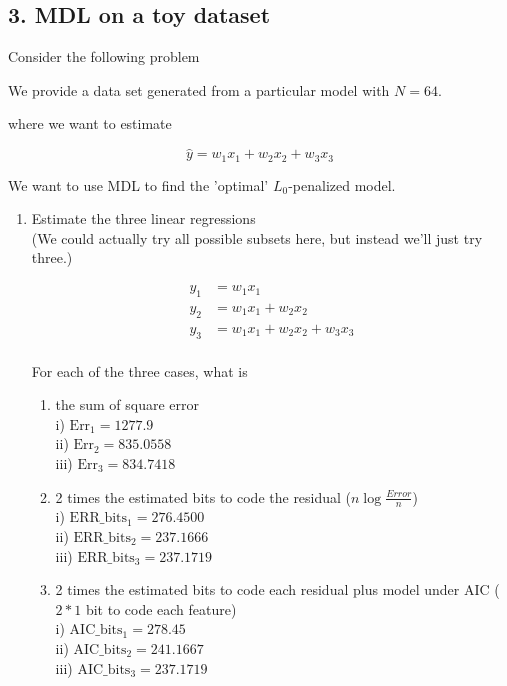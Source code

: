 \documentclass[english]{article}
\begin{document}
\subsection*{3. MDL on a toy dataset}

Consider the following problem

 We provide a data set generated from a particular model with $N=64$.

where we want to estimate

\begin{equation*}
 \hat{y} =  w_1 x_1 + w_2 x_2 + w_3 x_3 
\end{equation*}

We want to use MDL to find the 'optimal' $L_0$-penalized model.

\begin{enumerate}
\item  Estimate the three linear regressions \\

(We could actually try all possible subsets here, but instead we'll just try three.)

\begin{align*}
  y_1& = w_1 x_1 \\
  y_2& = w_1 x_1 + w_2 x_2 \\
  y_3& = w_1 x_1 + w_2 x_2 + w_3 x_3  \\
\end{align*}

For each of the three cases, what is
\begin{enumerate}
\item the sum of square error \\
i)   $\text{Err}_1 = 1277.9$ \\
ii)  $\text{Err}_2 = 835.0558$\\
iii) $\text{Err}_3 = 834.7418$\\

\item 2 times the estimated bits to code the residual ($n \log{\frac{Error}{n}} $)  \\
i)    $\text{ERR}\_\text{bits}_1 = 276.4500$ \\
ii)   $\text{ERR}\_\text{bits}_2 = 237.1666$ \\
iii)  $\text{ERR}\_\text{bits}_3 = 237.1719$ \\

\item 2 times the estimated bits to code each residual plus model under AIC ($2*1$ bit to code each feature) \\
i)    $\text{AIC}\_\text{bits}_1 = 278.45$ \\
ii)   $\text{AIC}\_\text{bits}_2 = 241.1667$ \\
iii)  $\text{AIC}\_\text{bits}_3 = 237.1719$ \\


\end{enumerate}
\end{enumerate}
\end{document}
